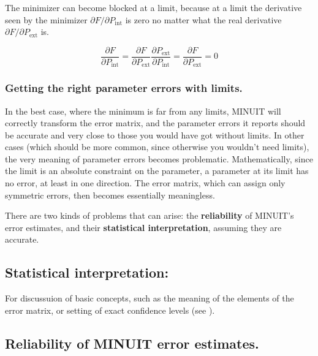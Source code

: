 The minimizer can become blocked at a limit, because at a limit
the derivative seen by the minimizer 
$\partial F / \partial P_{\mathrm{int}}$
is zero no matter what the real derivative
$\partial F / \partial P_{\mathrm{ext}}$ is.

$$
\frac{\partial F}{\partial P_{\mathrm{int}}}                =
\frac{\partial F}{\partial P_{\mathrm{ext}}}
\frac{\partial P_{\mathrm{ext}}}{\partial P_{\mathrm{int}}} =
\frac{\partial F}{\partial P_{\mathrm{ext}}}                = 0
$$

\subsubsection*{Getting the right parameter errors with limits.}


In the best case, where the minimum is far from any limits,
MINUIT will correctly transform the error matrix, and the
parameter errors it reports should be accurate and very
close to those you would have got without limits.
In other cases (which should be more common, since
otherwise you wouldn't need limits), the very meaning of
parameter errors becomes problematic.  
Mathematically, since
the limit is an absolute constraint on the parameter, a parameter
at its limit has no error, at least in one direction.
The error matrix, which can assign only symmetric errors, then
becomes essentially meaningless.


There are two kinds of problems that can arise:
the {\bf reliability} of MINUIT's error estimates, and their
{\bf statistical interpretation}, assuming they are accurate.

\subsection*{Statistical interpretation:}

For discussuion of basic concepts, such as the meaning of the elements
of the error matrix, or setting of exact confidence levels (see \cite{bib-EADIE}).

\subsection*{Reliability of MINUIT error estimates.}

